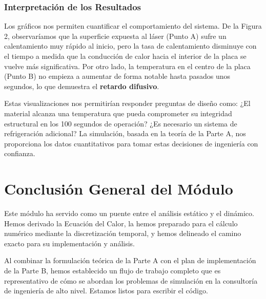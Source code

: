 \documentclass[11pt, a4paper]{article}
\begin{document}
\subsubsection{Interpretación de los Resultados}
Los gráficos nos permiten cuantificar el comportamiento del sistema. De la Figura 2, observaríamos que la superficie expuesta al láser (Punto A) sufre un calentamiento muy rápido al inicio, pero la tasa de calentamiento disminuye con el tiempo a medida que la conducción de calor hacia el interior de la placa se vuelve más significativa. Por otro lado, la temperatura en el centro de la placa (Punto B) no empieza a aumentar de forma notable hasta pasados unos segundos, lo que demuestra el \textbf{retardo difusivo}.

Estas visualizaciones nos permitirían responder preguntas de diseño como: ¿El material alcanza una temperatura que pueda comprometer su integridad estructural en los 100 segundos de operación? ¿Es necesario un sistema de refrigeración adicional? La simulación, basada en la teoría de la Parte A, nos proporciona los datos cuantitativos para tomar estas decisiones de ingeniería con confianza.

\section{Conclusión General del Módulo}
Este módulo ha servido como un puente entre el análisis estático y el dinámico. Hemos derivado la Ecuación del Calor, la hemos preparado para el cálculo numérico mediante la discretización temporal, y hemos delineado el camino exacto para su implementación y análisis.

Al combinar la formulación teórica de la Parte A con el plan de implementación de la Parte B, hemos establecido un flujo de trabajo completo que es representativo de cómo se abordan los problemas de simulación en la consultoría de ingeniería de alto nivel. Estamos listos para escribir el código.

\newpage


\end{document}
